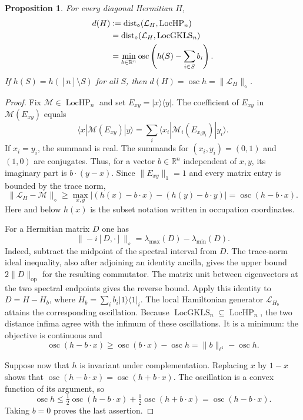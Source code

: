 \documentclass[reqno]{amsart}
\newtheorem{proposition}[theorem]{Proposition}
\theoremstyle{definition}
\theoremstyle{remark}
\newcommand{\R}{\mathbb R}
\begin{document}
\begin{proposition}
\label{rob:distance}
For every diagonal Hermitian $H$,
\begin{align}
 d(H)
 &:=
 \operatorname{dist}_\diamond(\mathcal L_H,\operatorname{LocHP}_n)
 \notag\\
 &=\operatorname{dist}_\diamond(\mathcal L_H,\operatorname{LocGKLS}_n)
 \notag\\
 &=\min_{b\in\R^n}\operatorname{osc}
       \left(h(S)-\sum_{i\in S}b_i\right).
 \label{rob:distance-formula}
\end{align}
If $h(S)=h([n]\setminus S)$ for all $S$, then
$d(H)=\operatorname{osc}h=\|\mathcal L_H\|_\diamond$.
\end{proposition}

\begin{proof}
Fix $\mathcal M\in\operatorname{LocHP}_n$ and set
$E_{xy}=|x\rangle\langle y|$.  The coefficient of $E_{xy}$ in
$\mathcal M(E_{xy})$ equals
\[
 \langle x|\mathcal M(E_{xy})|y\rangle
 =\sum_i\langle x_i|\mathcal M_i(E_{x_i y_i})|y_i\rangle.
\]
If $x_i=y_i$, the summand is real.  The summands for $(x_i,y_i)=(0,1)$
and $(1,0)$ are conjugates.  Thus, for a vector $b\in\R^n$ independent
of $x,y$, its imaginary part is $b\cdot(y-x)$.  Since
$\|E_{xy}\|_1=1$ and every matrix entry is bounded by the trace norm,
\[
 \|\mathcal L_H-\mathcal M\|_\diamond
 \geq \max_{x,y}
       |(h(x)-b\cdot x)-(h(y)-b\cdot y)|
 =\operatorname{osc}(h-b\cdot x).
\]
Here and below $h(x)$ is the subset notation written in occupation
coordinates.

For a Hermitian matrix $D$ one has
\begin{equation}
 \|-i[D,\cdot]\|_\diamond
   =\lambda_{\max}(D)-\lambda_{\min}(D).
 \label{rob:commutator-norm}
\end{equation}
Indeed, subtract the midpoint of the spectral interval from $D$.
The trace-norm ideal inequality, also after adjoining an identity
ancilla, gives the upper bound $2\|D\|_{\mathrm{op}}$ for the resulting
commutator.  The matrix unit between eigenvectors at the two spectral
endpoints gives the reverse bound.  Apply this identity to
$D=H-H_b$, where
$H_b=\sum_i b_i|1\rangle\langle1|_i$.
The local Hamiltonian generator $\mathcal L_{H_b}$ attains the
corresponding oscillation.  Because
$\operatorname{LocGKLS}_n\subseteq\operatorname{LocHP}_n$,
the two distance infima agree with the infimum of these oscillations.
It is a minimum: the objective is continuous and
\[
 \operatorname{osc}(h-b\cdot x)
 \geq \operatorname{osc}(b\cdot x)-\operatorname{osc}h
 =\|b\|_{\ell^1}-\operatorname{osc}h.
\]

Suppose now that $h$ is invariant under complementation.  Replacing
$x$ by $1-x$ shows that
$\operatorname{osc}(h-b\cdot x)=\operatorname{osc}(h+b\cdot x)$.
The oscillation is a convex function of its argument, so
\[
 \operatorname{osc}h
 \leq \tfrac12\operatorname{osc}(h-b\cdot x)
       +\tfrac12\operatorname{osc}(h+b\cdot x)
 =\operatorname{osc}(h-b\cdot x).
\]
Taking $b=0$ proves the last assertion.
\end{proof}
\end{document}
